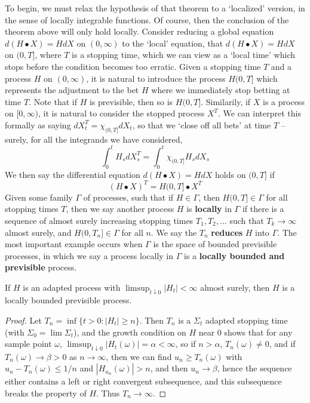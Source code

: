 To begin, we must relax the hypothesis of that theorem to a `localized' version, in the sense of locally integrable functions. Of course, then the conclusion of the theorem above will only hold locally. Consider reducing a global equation $d(H \bullet X) = HdX$ on $(0,\infty)$ to the `local' equation, that $d(H \bullet X) = HdX$ on $(0,T]$, where $T$ is a stopping time, which we can view as a `local time' which stops before the condition becomes too erratic. Given a stopping time $T$ and a process $H$ on $(0,\infty)$, it is natural to introduce the process $H(0,T]$ which represents the adjustment to the bet $H$ where we immediately stop betting at time $T$. Note that if $H$ is previsible, then so is $H(0,T]$. Similarily, if $X$ is a process on $[0,\infty)$, it is natural to consider the stopped process $X^T$. We can interpret this formally as saying $dX^T_t = \chi_{(0,T]} dX_t$, so that we `close off all bets' at time $T$ -- surely, for all the integrands we have considered,
%
\[ \int_0^t H_s dX^T_s = \int_0^t \chi_{(0,T]} H_s dX_s \]
%
We then say the differential equation $d(H \bullet X) = HdX$ holds on $(0,T]$ if
%
\[ (H \bullet X)^T = H(0,T] \bullet X^T \]
%
Given some family $\Gamma$ of processes, such that if $H \in \Gamma$, then $H(0,T] \in \Gamma$ for all stopping times $T$, then we say another process $H$ is {\bf locally} in $\Gamma$ if there is a sequence of almost surely increasing stopping times $T_1, T_2, \dots$ such that $T_k \to \infty$ almost surely, and $H(0,T_n] \in \Gamma$ for all $n$. We say the $T_n$ {\bf reduces} $H$ into $\Gamma$. The most important example occurs when $\Gamma$ is the space of bounded previsible processes, in which we say a process locally in $\Gamma$ is a {\bf locally bounded and previsible} process.

\begin{lemma}
    If $H$ is an adapted \caglad process with $\limsup_{t \downarrow 0} |H_t| < \infty$ almost surely, then $H$ is a locally bounded previsible process.
\end{lemma}
\begin{proof}
    Let $T_n = \inf \{ t > 0: |H_t| \geq n \}$. Then $T_n$ is a $\Sigma_t$ adapted stopping time (with $\Sigma_0 = \lim \Sigma_t$), and the growth condition on $H$ near $0$ shows that for any sample point $\omega$, $\limsup_{ t \downarrow 0} |H_t(\omega)| = \alpha < \infty$, so if $n > \alpha$, $T_n(\omega) \neq 0$, and if $T_n(\omega) \to \beta > 0$ as $n \to \infty$, then we can find $u_n \geq T_n(\omega)$ with $u_n - T_n(\omega) \leq 1/n$ and $|H_{u_n}(\omega)| > n$, and then $u_n \to \beta$, hence the sequence either contains a left or right convergent subsequence, and this subsequence breaks the \caglad property of $H$. Thus $T_n \to \infty$.
\end{proof}

